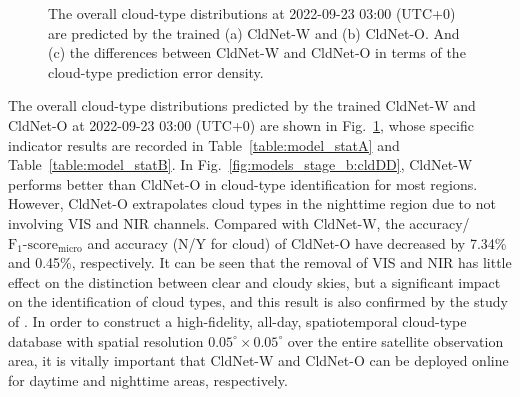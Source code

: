 \documentclass[review]{elsarticle}
\begin{document}
\begin{figure}[!htp]
    \centering
    \hfill
    \caption{The overall cloud-type distributions at 2022-09-23 03:00 (UTC+0) are predicted by the trained (a) CldNet-W and (b) CldNet-O. And (c) the differences between CldNet-W and CldNet-O in terms of the cloud-type prediction error density.}
    \label{fig:models_stage_b}
\end{figure}

The overall cloud-type distributions predicted by the trained CldNet-W and CldNet-O at 2022-09-23 03:00 (UTC+0) are shown in Fig.~\ref{fig:models_stage_b}, whose specific indicator results are recorded in Table~\ref{table:model_statA} and Table~\ref{table:model_statB}.
In Fig.~\ref{fig:models_stage_b:cldDD}, CldNet-W performs better than CldNet-O in cloud-type identification for most regions.
However, CldNet-O extrapolates cloud types in the nighttime region due to not involving VIS and NIR channels.
Compared with CldNet-W, the accuracy/$\mathrm{F_{1}\mbox{-}score_{micro}}$ and accuracy (N/Y for cloud) of CldNet-O have decreased by 7.34\% and 0.45\%, respectively.
It can be seen that the removal of VIS and NIR has little effect on the distinction between clear and cloudy skies, but a significant impact on the identification of cloud types, and this result is also confirmed by the study of \citet{Zhang20196464}.
In order to construct a high-fidelity, all-day, spatiotemporal cloud-type database with spatial resolution $0.05^{\circ}\times0.05^{\circ}$ over the entire satellite observation area, it is vitally important that CldNet-W and CldNet-O can be deployed online for daytime and nighttime areas, respectively.
\end{document}
